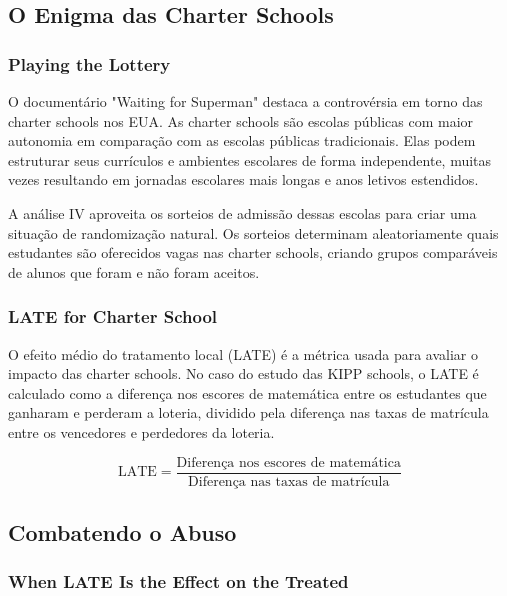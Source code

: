 \documentclass[a4paper,12pt]{article}[abntex2]
\begin{document}
\subsection{O Enigma das Charter Schools}

\subsubsection*{Playing the Lottery}

O documentário "Waiting for Superman" destaca a controvérsia em torno das charter schools nos EUA. As charter schools são escolas públicas com maior autonomia em comparação com as escolas públicas tradicionais. Elas podem estruturar seus currículos e ambientes escolares de forma independente, muitas vezes resultando em jornadas escolares mais longas e anos letivos estendidos.

A análise IV aproveita os sorteios de admissão dessas escolas para criar uma situação de randomização natural. Os sorteios determinam aleatoriamente quais estudantes são oferecidos vagas nas charter schools, criando grupos comparáveis de alunos que foram e não foram aceitos.

\subsubsection*{LATE for Charter School}

O efeito médio do tratamento local (LATE) é a métrica usada para avaliar o impacto das charter schools. No caso do estudo das KIPP schools, o LATE é calculado como a diferença nos escores de matemática entre os estudantes que ganharam e perderam a loteria, dividido pela diferença nas taxas de matrícula entre os vencedores e perdedores da loteria.

\begin{equation}
    \text{LATE} = \frac{\text{Diferença nos escores de matemática}}{\text{Diferença nas taxas de matrícula}}
\end{equation}

\subsection{Combatendo o Abuso}

\subsubsection*{When LATE Is the Effect on the Treated}
\end{document}
